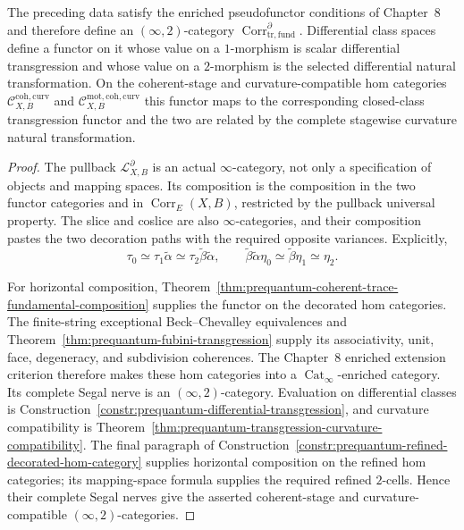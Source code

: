 \begin{theorem}
\label{thm:prequantum-functorial-transgression}
The preceding data satisfy the enriched pseudofunctor conditions of Chapter~8
and therefore define an $(\infty,2)$-category
$\operatorname{Corr}^{\partial}_{\mathrm{tr,fund}}$.  Differential class spaces
define a functor on it whose value on a $1$-morphism is scalar differential
transgression and whose value on a $2$-morphism is the selected differential
natural transformation.  On the coherent-stage and curvature-compatible
hom categories
$\mathcal C_{X,B}^{\mathrm{coh,curv}}$ and
$\mathcal C_{X,B}^{\mathrm{mot,coh,curv}}$ this functor maps to the
corresponding closed-class transgression functor and the two are related by the
complete stagewise curvature natural transformation.
\end{theorem}

\begin{proof}
The pullback $\mathcal L_{X,B}^{\partial}$ is an actual $\infty$-category, not
only a specification of objects and mapping spaces.  Its composition is the
composition in the two functor categories and in
$\operatorname{Corr}_E(X,B)$, restricted by the pullback universal property.
The slice and coslice are also $\infty$-categories, and their composition pastes
the two decoration paths with the required opposite variances.  Explicitly,
\[
\tau_0\simeq\tau_1\widetilde\alpha
      \simeq\tau_2\widetilde\beta\widetilde\alpha,
\qquad
\widetilde\beta\widetilde\alpha\eta_0
\simeq\widetilde\beta\eta_1
\simeq\eta_2.
\]

For horizontal composition,
Theorem~\ref{thm:prequantum-coherent-trace-fundamental-composition} supplies the
functor on the decorated hom categories.  The finite-string exceptional
Beck--Chevalley equivalences and
Theorem~\ref{thm:prequantum-fubini-transgression} supply its associativity,
unit, face, degeneracy, and subdivision coherences.  The Chapter~8 enriched
extension criterion therefore makes these hom categories into a
$\operatorname{Cat}_{\infty}$-enriched category.  Its complete Segal nerve is an
$(\infty,2)$-category.  Evaluation on differential classes is
Construction~\ref{constr:prequantum-differential-transgression}, and curvature
compatibility is
Theorem~\ref{thm:prequantum-transgression-curvature-compatibility}.
The final paragraph of
Construction~\ref{constr:prequantum-refined-decorated-hom-category} supplies
horizontal composition on the refined hom categories; its mapping-space formula
supplies the required refined $2$-cells.  Hence their complete Segal nerves give
the asserted coherent-stage and curvature-compatible $(\infty,2)$-categories.
\end{proof}


